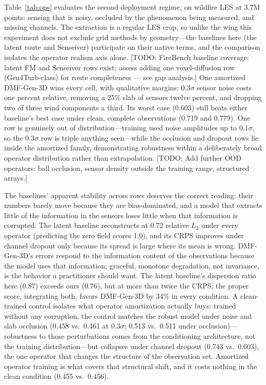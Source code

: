 \documentclass{article} %
\newcommand{\todo}[1]{{\color{red}[TODO: #1]}}
\newcommand{\model}{DMF-Gen-3D}
\begin{document}
Table~\ref{tab:ops} evaluates the second deployment regime, on wildfire LES at $3.7$M points: sensing that is noisy, occluded by the phenomenon being measured, and missing channels. The extraction is a regular LES crop, so unlike the wing this experiment does not exclude grid methods by geometry---the baselines here (the latent route and Senseiver) participate on their native terms, and the comparison isolates the operator realism axis alone. \todo{FireBench baseline coverage: latent FM and Senseiver rows exist; assess adding one voxel-diffusion row (Gen4Turb-class) for route completeness --- see gap analysis.} One amortized \model{} wins every cell, with qualitative margins: $0.3\sigma$ sensor noise costs one percent relative, removing a 25\% slab of sensors twelve percent, and dropping two of three wind components a third. Its worst case (0.603) still beats either baseline's best case under clean, complete observations (0.719 and 0.779). One row is genuinely out of distribution---training used noise amplitudes up to $0.1\sigma$, so the $0.3\sigma$ row is triple anything seen---while the occlusion and dropout rows lie inside the amortized family, demonstrating robustness within a deliberately broad operator distribution rather than extrapolation. \todo{Add further OOD operators: ball occlusion, sensor density outside the training range, structured arrays.}

The baselines' apparent stability across rows deserves the correct reading: their numbers barely move because they are bias-dominated, and a model that extracts little of the information in the sensors loses little when that information is corrupted. The latent baseline reconstructs at 0.72 relative $L_2$ under every operator (predicting the zero field scores 1.0), and its CRPS improves under channel dropout only because its spread is large where its mean is wrong. \model{}'s errors respond to the information content of the observations because the model uses that information; graceful, monotone degradation, not invariance, is the behavior a practitioner should want. The latent baseline's dispersion ratio here (0.87) exceeds ours (0.76), but at more than twice the CRPS; the proper score, integrating both, favors \model{} by 34\% in every condition. A clean-trained control isolates what operator amortization actually buys: trained without any corruption, the control matches the robust model under noise and slab occlusion (0.458 vs.\ 0.461 at $0.3\sigma$; 0.513 vs.\ 0.511 under occlusion)---robustness to those perturbations comes from the conditioning architecture, not the training distribution---but collapses under channel dropout (0.743 vs.\ 0.603), the one operator that changes the structure of the observation set. Amortized operator training is what covers that structural shift, and it costs nothing in the clean condition (0.455 vs.\ 0.456).
\end{document}
